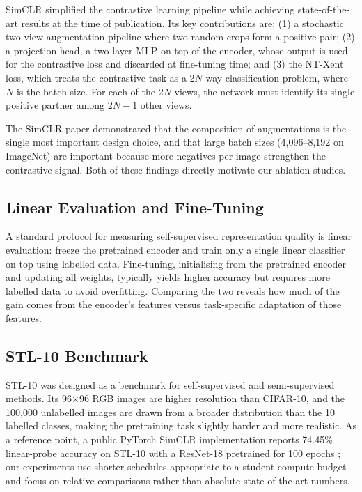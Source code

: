 \documentclass[twoside,a4paper,11pt]{article}
\begin{document}
SimCLR \cite{chen2020simclr} simplified the contrastive learning pipeline while
achieving state-of-the-art results at the time of publication. Its key contributions
are: (1) a stochastic two-view augmentation pipeline where two random crops form a
positive pair; (2) a projection head, a two-layer MLP on top of the encoder, whose
output is used for the contrastive loss and discarded at fine-tuning time; and (3) the
NT-Xent loss, which treats the contrastive task as a $2N$-way classification problem,
where $N$ is the batch size. For each of the $2N$ views, the network must identify its
single positive partner among $2N-1$ other views.

The SimCLR paper demonstrated that the composition of augmentations is the single most
important design choice, and that large batch sizes (4,096--8,192 on ImageNet) are
important because more negatives per image strengthen the contrastive signal. Both of
these findings directly motivate our ablation studies.

\subsection{Linear Evaluation and Fine-Tuning}

A standard protocol for measuring self-supervised representation quality is linear
evaluation: freeze the pretrained encoder and train only a single linear classifier on
top using labelled data. Fine-tuning, initialising from the pretrained encoder and
updating all weights, typically yields higher accuracy but requires more labelled data
to avoid overfitting. Comparing the two reveals how much of the gain comes from the
encoder's features versus task-specific adaptation of those features.

\subsection{STL-10 Benchmark}

STL-10 \cite{coates2011stl10} was designed as a benchmark for self-supervised and
semi-supervised methods. Its 96$\times$96 RGB images are higher resolution than
CIFAR-10, and the 100,000 unlabelled images are drawn from a broader distribution than
the 10 labelled classes, making the pretraining task slightly harder and more
realistic. As a reference point, a public PyTorch SimCLR implementation reports 74.45\%
linear-probe accuracy on STL-10 with a ResNet-18 pretrained for 100 epochs
\cite{silva2020simclr}; our experiments use
shorter schedules appropriate to a student compute budget and focus on relative
comparisons rather than absolute state-of-the-art numbers.
\end{document}
